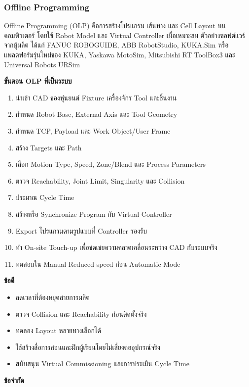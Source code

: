 \subsubsection{Offline Programming}

Offline Programming (OLP) คือการสร้างโปรแกรม เส้นทาง และ Cell Layout บนคอมพิวเตอร์ โดยใช้ Robot Model และ Virtual Controller เมื่อเหมาะสม ตัวอย่างซอฟต์แวร์จากผู้ผลิต ได้แก่ FANUC ROBOGUIDE, ABB RobotStudio, KUKA.Sim หรือแพลตฟอร์มรุ่นใหม่ของ KUKA, Yaskawa MotoSim, Mitsubishi RT ToolBox3 และ Universal Robots URSim

\textbf{ขั้นตอน OLP ที่เป็นระบบ}

\begin{enumerate}
    \item นำเข้า CAD ของหุ่นยนต์ Fixture เครื่องจักร Tool และชิ้นงาน
    \item กำหนด Robot Base, External Axis และ Tool Geometry
    \item กำหนด TCP, Payload และ Work Object/User Frame
    \item สร้าง Targets และ Path
    \item เลือก Motion Type, Speed, Zone/Blend และ Process Parameters
    \item ตรวจ Reachability, Joint Limit, Singularity และ Collision
    \item ประมาณ Cycle Time
    \item สร้างหรือ Synchronize Program กับ Virtual Controller
    \item Export โปรแกรมตามรูปแบบที่ Controller รองรับ
    \item ทำ On-site Touch-up เพื่อชดเชยความคลาดเคลื่อนระหว่าง CAD กับระบบจริง
    \item ทดสอบใน Manual Reduced-speed ก่อน Automatic Mode
\end{enumerate}

\textbf{ข้อดี}

\begin{itemize}
    \item ลดเวลาที่ต้องหยุดสายการผลิต
    \item ตรวจ Collision และ Reachability ก่อนติดตั้งจริง
    \item ทดลอง Layout หลายทางเลือกได้
    \item ใช้สร้างสื่อการสอนและฝึกผู้เรียนโดยไม่เสี่ยงต่ออุปกรณ์จริง
    \item สนับสนุน Virtual Commissioning และการประเมิน Cycle Time
\end{itemize}

\textbf{ข้อจำกัด}

